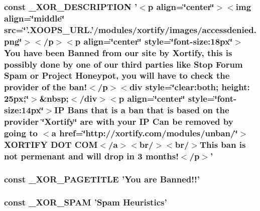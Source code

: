 \hypertarget{ban_8php_aff93f77f179e77eefb0099807ed2605a}{
\subsubsection[{\-\_\-\-X\-O\-R\-\_\-\-D\-E\-S\-C\-R\-I\-P\-T\-I\-O\-N}]{\setlength{\rightskip}{0pt plus 5cm}const \-\_\-\-X\-O\-R\-\_\-\-D\-E\-S\-C\-R\-I\-P\-T\-I\-O\-N '$<$p align=\char`\"{}center\char`\"{}$>$$<$img align=\char`\"{}middle\char`\"{} src=\char`\"{}'.X\-O\-O\-P\-S\-\_\-\-U\-R\-L.'/modules/xortify/images/accessdenied.\-png\char`\"{}$>$$<$/p$>$$<$p align=\char`\"{}center\char`\"{} style=\char`\"{}font-\/size\-:18px\char`\"{}$>$You have been Banned from our site by Xortify, this is possibly done by one of our third parties like Stop Forum Spam or Project Honeypot, you will have to check the provider of the ban!$<$/p$>$$<$div style=\char`\"{}clear\-:both; height\-: 25px;\char`\"{}$>$\&nbsp;$<$/div$>$$<$p align=\char`\"{}center\char`\"{} style=\char`\"{}font-\/size\-:14px\char`\"{}$>$\-I\-P Bans that is a ban that is based on the provider \char`\"{}\-Xortify\char`\"{} are with your I\-P Can be removed by going to $<$a href=\char`\"{}http\-://xortify.\-com/modules/unban/\char`\"{}$>$\-X\-O\-R\-T\-I\-F\-Y D\-O\-T C\-O\-M$<$/a$>$$<$br/$>$$<$br/$>$\-This ban is not permenant and will drop in 3 months!$<$/p$>$'}}\label{ban_8php_aff93f77f179e77eefb0099807ed2605a}
\hypertarget{ban_8php_aa879fc3c50b0de0ec937a511dc798057}{
\subsubsection[{\-\_\-\-X\-O\-R\-\_\-\-P\-A\-G\-E\-T\-I\-T\-L\-E}]{\setlength{\rightskip}{0pt plus 5cm}const \-\_\-\-X\-O\-R\-\_\-\-P\-A\-G\-E\-T\-I\-T\-L\-E 'You are Banned!!'}}\label{ban_8php_aa879fc3c50b0de0ec937a511dc798057}
\hypertarget{ban_8php_a5e2ba7d14d9e4b46ebbdae6ef0f62e7d}{
\subsubsection[{\-\_\-\-X\-O\-R\-\_\-\-S\-P\-A\-M}]{\setlength{\rightskip}{0pt plus 5cm}const \-\_\-\-X\-O\-R\-\_\-\-S\-P\-A\-M 'Spam Heuristics'}}\label{ban_8php_a5e2ba7d14d9e4b46ebbdae6ef0f62e7d}
